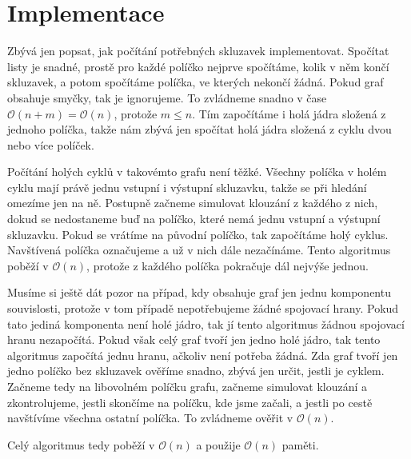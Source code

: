 \documentclass{article}
\begin{document}
\section{Implementace}

Zbývá jen popsat, jak počítání potřebných skluzavek implementovat. Spočítat listy je snadné, prostě pro každé políčko nejprve spočítáme, kolik v něm končí skluzavek, a potom spočítáme políčka, ve kterých nekončí žádná. Pokud graf obsahuje smyčky, tak je ignorujeme. To zvládneme snadno v čase $\mathcal{O}(n + m) = \mathcal{O}(n)$, protože $m \leq n$. Tím započítáme i holá jádra složená z jednoho políčka, takže nám zbývá jen spočítat holá jádra složená z cyklu dvou nebo více políček.

Počítání holých cyklů v takovémto grafu není těžké. Všechny políčka v holém cyklu mají právě jednu vstupní i výstupní skluzavku, takže se při hledání omezíme jen na ně. Postupně začneme simulovat klouzání z každého z nich, dokud se nedostaneme buď na políčko, které nemá jednu vstupní a výstupní skluzavku. Pokud se vrátíme na původní políčko, tak započítáme holý cyklus. Navštívená políčka označujeme a už v nich dále nezačínáme. Tento algoritmus poběží v $\mathcal{O}(n)$, protože z každého políčka pokračuje dál nejvýše jednou.

Musíme si ještě dát pozor na případ, kdy obsahuje graf jen jednu komponentu souvislosti, protože v tom případě nepotřebujeme žádné spojovací hrany. Pokud tato jediná komponenta není holé jádro, tak jí tento algoritmus žádnou spojovací hranu nezapočítá. Pokud však celý graf tvoří jen jedno holé jádro, tak tento algoritmus započítá jednu hranu, ačkoliv není potřeba žádná. Zda graf tvoří jen jedno políčko bez skluzavek ověříme snadno, zbývá jen určit, jestli je cyklem. Začneme tedy na libovolném políčku grafu, začneme simulovat klouzání a zkontrolujeme, jestli skončíme na políčku, kde jsme začali, a jestli po cestě navštívíme všechna ostatní políčka. To zvládneme ověřit v $\mathcal{O}(n)$.

Celý algoritmus tedy poběží v $\mathcal{O}(n)$ a použije $\mathcal{O}(n)$ paměti.
\end{document}
